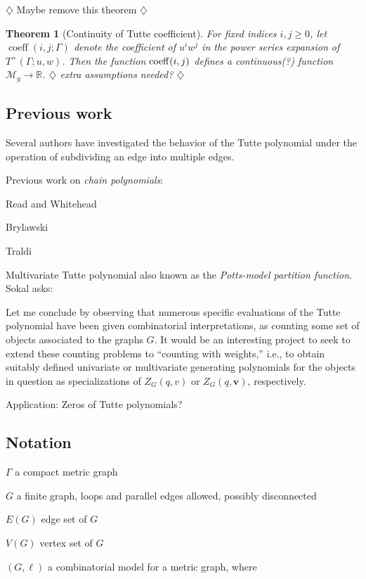 \documentclass{amsart}
\newtheorem{thm}{Theorem}
\theoremstyle{definition}
\newcommand{\RR}{\mathbb{R}}
\DeclareMathOperator{\coeff}{coeff}
\newcommand{\harry}[1]{{\color{red} \sf $\diamondsuit$  {#1} $\diamondsuit$ }}
\newcommand{\note}[1]{\harry{#1}}
\begin{document}
\note{Maybe remove this theorem}
\begin{thm}[Continuity of Tutte coefficient]
For fixed indices $i,j\geq 0$,
let $\coeff(i,j; \Gamma)$
denote the coefficient of $u^i w^j$ in the power series expansion of $T^+(\Gamma; u,w)$.
Then the function ${\rm coeff}(i,j)$
defines a continuous(?) 
function $\mathcal M_g \to \RR$.
\note{extra assumptions needed?}
\end{thm}

\subsection{Previous work} 

Several authors have investigated the behavior of the Tutte polynomial under the operation of subdividing an edge into multiple edges.

Previous work on {\em chain polynomials}:

Read and Whitehead \cite{RW2}

Brylawski \cite{Bry}

Traldi \cite{Tra1,Tra2,Tra3}

\cite{RW1,RW2}

Multivariate Tutte polynomial \cite{Sok-potts}
also known as the {\em Potts-model partition function}.
Sokal \cite{Sok-potts} asks:
\begin{displayquote}
Let me conclude by observing that numerous specific evaluations of the Tutte polynomial have been given combinatorial interpretations, 
as counting some set of objects associated to the graphs $G$. 
It would be an interesting project to seek to extend these counting problems to ``counting with weights,''
i.e., to obtain suitably defined univariate or multivariate generating polynomials for the objects in question as specializations of 
$Z_G(q,v)$ or $Z_G(q,\mathbf{v})$, respectively.
\end{displayquote}
Application: Zeros of Tutte polynomials?

\subsection{Notation}

$\Gamma$ a compact metric graph

$G$ a finite graph, 
loops and parallel edges allowed,
possibly disconnected

$E(G)$ edge set of $G$

$V(G)$ vertex set of $G$

$(G,\ell)$ a combinatorial model for a metric graph,
where 
\end{document}
